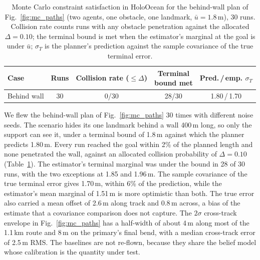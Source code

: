 \documentclass[letterpaper, 10 pt, conference]{ieeeconf}
\theoremstyle{remark}
\begin{document}
\begin{table}[t]
      \centering
  \footnotesize
  \setlength{\tabcolsep}{4pt}
  \begin{tabular}{@{}lcccc@{}}
    \toprule
    Case & Runs & \makecell{Collision\\rate ($\le\Delta$)} & \makecell{Terminal\\bound met} & \makecell{Pred.\,/\,emp.\\$\sigma_T$} \\
    \midrule
    Behind wall & 30 & 0/30 & 28/30 & 1.80\,/\,1.70 \\
    \bottomrule
  \end{tabular}
  \caption{Monte Carlo constraint satisfaction in HoloOcean for the behind-wall
    plan of Fig.~\ref{fig:mc_paths} (two agents, one obstacle, one landmark,
    $\bar u = 1.8$\,m), 30 runs. Collision rate counts runs with any obstacle
    penetration against the allocated $\Delta = 0.10$; the terminal bound is
    met when the estimator's marginal at the goal is under $\bar u$;
    $\sigma_T$ is the planner's prediction against the sample covariance of
    the true terminal error.}
  \label{tab:mc}
\end{table}

We flew the behind-wall plan of Fig.~\ref{fig:mc_paths} 30 times with
different noise seeds. The scenario hides its one landmark behind a wall
400\,m long, so only the support can see it, under a terminal bound of
1.8\,m against which the planner predicts 1.80\,m. Every run reached the
goal within 2\% of the
planned length and none penetrated the wall, against an allocated collision
probability of $\Delta = 0.10$ (Table~\ref{tab:mc}).
The estimator's terminal marginal was under the bound in 28 of 30 runs, with
the two exceptions at 1.85 and 1.96\,m. The sample covariance of the true
terminal error gives 1.70\,m, within 6\% of the prediction, while the
estimator's mean marginal of 1.51\,m is more optimistic than both. The true
error also carried a mean offset of 2.6\,m along track and 0.8\,m across, a
bias of the estimate that a covariance comparison does not capture. The
$2\sigma$ cross-track envelope in Fig.~\ref{fig:mc_paths} has a half-width
of about 4\,m along most of the 1.1\,km route and 8\,m on the primary's
final bend, with a median cross-track error of 2.5\,m RMS. The baselines are
not re-flown, because they share the belief model whose calibration is the
quantity under test.

\end{document}
